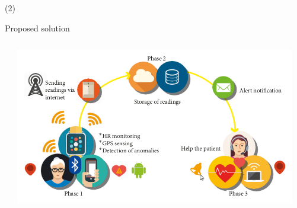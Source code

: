 \begin{frame}{ (2)}
\begin{block}{Proposed solution}
\begin{columns}
\begin{column}{0.4\textwidth}
\end{column}
\begin{column}{0.6\textwidth}
    \begin{center}
         \includegraphics[width=0.96\textwidth]{Figs/SignosVitales1}
     \end{center}
\end{column}
\end{columns}
\end{block}


\end{frame} 



